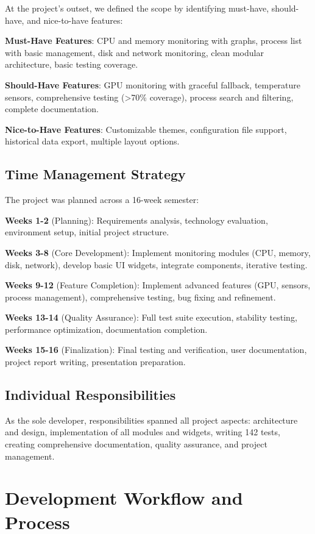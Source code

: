 \documentclass[12pt,a4paper,oneside]{report}
\begin{document}
At the project's outset, we defined the scope by identifying must-have, should-have, and nice-to-have features:

\textbf{Must-Have Features}: CPU and memory monitoring with graphs, process list with basic management, disk and network monitoring, clean modular architecture, basic testing coverage.

\textbf{Should-Have Features}: GPU monitoring with graceful fallback, temperature sensors, comprehensive testing (>70\% coverage), process search and filtering, complete documentation.

\textbf{Nice-to-Have Features}: Customizable themes, configuration file support, historical data export, multiple layout options.

\subsection{Time Management Strategy}

The project was planned across a 16-week semester:

\textbf{Weeks 1-2} (Planning): Requirements analysis, technology evaluation, environment setup, initial project structure.

\textbf{Weeks 3-8} (Core Development): Implement monitoring modules (CPU, memory, disk, network), develop basic UI widgets, integrate components, iterative testing.

\textbf{Weeks 9-12} (Feature Completion): Implement advanced features (GPU, sensors, process management), comprehensive testing, bug fixing and refinement.

\textbf{Weeks 13-14} (Quality Assurance): Full test suite execution, stability testing, performance optimization, documentation completion.

\textbf{Weeks 15-16} (Finalization): Final testing and verification, user documentation, project report writing, presentation preparation.

\subsection{Individual Responsibilities}

As the sole developer, responsibilities spanned all project aspects: architecture and design, implementation of all modules and widgets, writing 142 tests, creating comprehensive documentation, quality assurance, and project management.

\section{Development Workflow and Process}
\label{sec:development-workflow}
\end{document}
